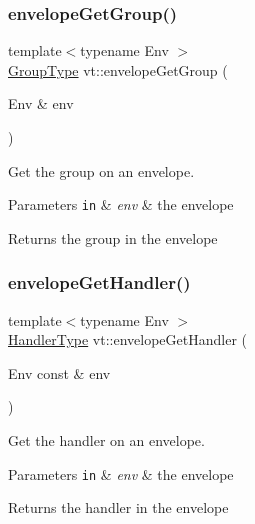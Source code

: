 \subsubsection{\texorpdfstring{envelope\+Get\+Group()}{envelopeGetGroup()}}
{\footnotesize\ttfamily template$<$typename Env $>$ \\
\hyperlink{namespacevt_a27b5e4411c9b6140c49100e050e2f743}{Group\+Type} vt\+::envelope\+Get\+Group (\begin{DoxyParamCaption}\item[{Env \&}]{env }\end{DoxyParamCaption})\hspace{0.3cm}{\ttfamily [inline]}}



Get the group on an envelope. 


\begin{DoxyParams}[1]{Parameters}
\mbox{\tt in}  & {\em env} & the envelope\\
\hline
\end{DoxyParams}
\begin{DoxyReturn}{Returns}
the group in the envelope 
\end{DoxyReturn}
\mbox{\label{namespacevt_ad3c1fff07670b717ba492d97e9eecc48}} 
\subsubsection{\texorpdfstring{envelope\+Get\+Handler()}{envelopeGetHandler()}}
{\footnotesize\ttfamily template$<$typename Env $>$ \\
\hyperlink{namespacevt_af64846b57dfcaf104da3ef6967917573}{Handler\+Type} vt\+::envelope\+Get\+Handler (\begin{DoxyParamCaption}\item[{Env const \&}]{env }\end{DoxyParamCaption})\hspace{0.3cm}{\ttfamily [inline]}}



Get the handler on an envelope. 


\begin{DoxyParams}[1]{Parameters}
\mbox{\tt in}  & {\em env} & the envelope\\
\hline
\end{DoxyParams}
\begin{DoxyReturn}{Returns}
the handler in the envelope 
\end{DoxyReturn}
\mbox{\label{namespacevt_a56ab014300930ba8ffc902793035eca2}} 
